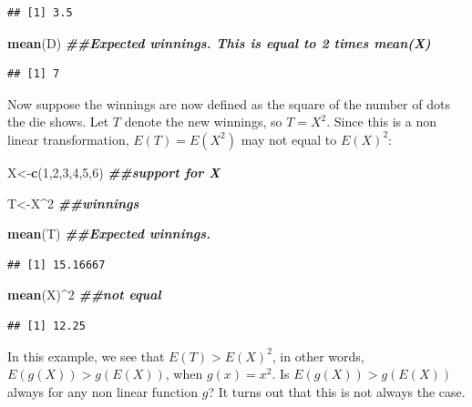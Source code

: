 \documentclass[
]{book}
\newenvironment{Shaded}{\begin{snugshade}}{\end{snugshade}}
\newcommand{\DecValTok}[1]{\textcolor[rgb]{0.00,0.00,0.81}{#1}}
\newcommand{\DocumentationTok}[1]{\textcolor[rgb]{0.56,0.35,0.01}{\textbf{\textit{#1}}}}
\newcommand{\FunctionTok}[1]{\textcolor[rgb]{0.13,0.29,0.53}{\textbf{#1}}}
\newcommand{\NormalTok}[1]{#1}
\newcommand{\OtherTok}[1]{\textcolor[rgb]{0.56,0.35,0.01}{#1}}
\newcommand{\SpecialCharTok}[1]{\textcolor[rgb]{0.81,0.36,0.00}{\textbf{#1}}}
\begin{document}
\begin{verbatim}
## [1] 3.5
\end{verbatim}

\begin{Shaded}
\begin{Highlighting}[]
\FunctionTok{mean}\NormalTok{(D) }\DocumentationTok{\#\#Expected winnings. This is equal to 2 times mean(X)}
\end{Highlighting}
\end{Shaded}

\begin{verbatim}
## [1] 7
\end{verbatim}

Now suppose the winnings are now defined as the square of the number of dots the die shows. Let \(T\) denote the new winnings, so \(T = X^2\). Since this is a non linear transformation, \(E(T) = E(X^2)\) may not equal to \(E(X)^2\):

\begin{Shaded}
\begin{Highlighting}[]
\NormalTok{X}\OtherTok{\textless{}{-}}\FunctionTok{c}\NormalTok{(}\DecValTok{1}\NormalTok{,}\DecValTok{2}\NormalTok{,}\DecValTok{3}\NormalTok{,}\DecValTok{4}\NormalTok{,}\DecValTok{5}\NormalTok{,}\DecValTok{6}\NormalTok{) }\DocumentationTok{\#\#support for X}

\NormalTok{T}\OtherTok{\textless{}{-}}\NormalTok{X}\SpecialCharTok{\^{}}\DecValTok{2} \DocumentationTok{\#\#winnings}

\FunctionTok{mean}\NormalTok{(T) }\DocumentationTok{\#\#Expected winnings. }
\end{Highlighting}
\end{Shaded}

\begin{verbatim}
## [1] 15.16667
\end{verbatim}

\begin{Shaded}
\begin{Highlighting}[]
\FunctionTok{mean}\NormalTok{(X)}\SpecialCharTok{\^{}}\DecValTok{2} \DocumentationTok{\#\#not equal}
\end{Highlighting}
\end{Shaded}

\begin{verbatim}
## [1] 12.25
\end{verbatim}

In this example, we see that \(E(T) > E(X)^2\), in other words, \(E(g(X)) > g(E(X))\), when \(g(x) = x^2\). Is \(E(g(X)) > g(E(X))\) always for any non linear function \(g\)? It turns out that this is not always the case.
\end{document}
